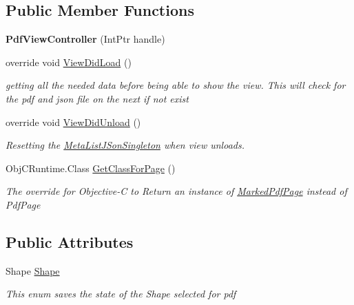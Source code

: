 \subsection*{Public Member Functions}
\begin{DoxyCompactItemize}
\item 
\mbox{\label{class_ramboell_1_1i_o_s_1_1_pdf_view_controller_a51b992b2b10ea7341a981b49cc1b6216}} 
{\bfseries Pdf\+View\+Controller} (Int\+Ptr handle)
\item 
override void \hyperlink{class_ramboell_1_1i_o_s_1_1_pdf_view_controller_a6ffe0642ee3a6af8e624afe3b9450943}{View\+Did\+Load} ()
\begin{DoxyCompactList}\small\item\em getting all the needed data before being able to show the view. This will check for the pdf and json file on the next if not exist \end{DoxyCompactList}\item 
override void \hyperlink{class_ramboell_1_1i_o_s_1_1_pdf_view_controller_a203e0e87fd40da6f90ffbe9ffe96c65f}{View\+Did\+Unload} ()
\begin{DoxyCompactList}\small\item\em Resetting the \hyperlink{class_ramboell_1_1i_o_s_1_1_meta_list_j_son_singleton}{Meta\+List\+J\+Son\+Singleton} when view unloads. \end{DoxyCompactList}\item 
Obj\+C\+Runtime.\+Class \hyperlink{class_ramboell_1_1i_o_s_1_1_pdf_view_controller_a2d7a663fc7396055d1a38753e1910ade}{Get\+Class\+For\+Page} ()
\begin{DoxyCompactList}\small\item\em The override for Objective-\/C to Return an instance of \hyperlink{class_ramboell_1_1i_o_s_1_1_marked_pdf_page}{Marked\+Pdf\+Page} instead of Pdf\+Page \end{DoxyCompactList}\end{DoxyCompactItemize}
\subsection*{Public Attributes}
\begin{DoxyCompactItemize}
\item 
Shape \hyperlink{class_ramboell_1_1i_o_s_1_1_pdf_view_controller_ae9d97ce3c5ade4517fe1191c2dd25707}{Shape}
\begin{DoxyCompactList}\small\item\em This enum saves the state of the Shape selected for pdf \end{DoxyCompactList}\end{DoxyCompactItemize}
